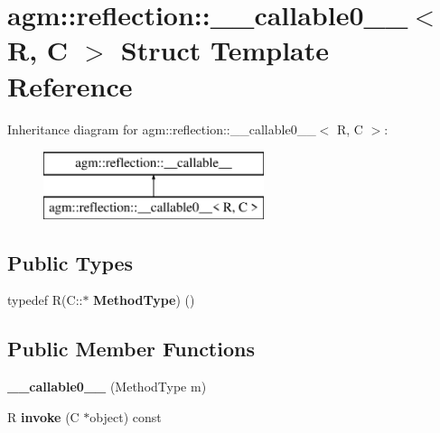 \hypertarget{structagm_1_1reflection_1_1____callable0____}{}\section{agm\+:\+:reflection\+:\+:\+\_\+\+\_\+callable0\+\_\+\+\_\+$<$ R, C $>$ Struct Template Reference}
\label{structagm_1_1reflection_1_1____callable0____}
Inheritance diagram for agm\+:\+:reflection\+:\+:\+\_\+\+\_\+callable0\+\_\+\+\_\+$<$ R, C $>$\+:\begin{figure}[H]
\begin{center}
\leavevmode
\includegraphics[height=2.000000cm]{structagm_1_1reflection_1_1____callable0____}
\end{center}
\end{figure}
\subsection*{Public Types}
\begin{DoxyCompactItemize}
\item 
typedef R(C\+::$\ast$ {\bfseries Method\+Type}) ()\hypertarget{structagm_1_1reflection_1_1____callable0_____ad9645c6039833612d539082e271edb31}{}\label{structagm_1_1reflection_1_1____callable0_____ad9645c6039833612d539082e271edb31}

\end{DoxyCompactItemize}
\subsection*{Public Member Functions}
\begin{DoxyCompactItemize}
\item 
{\bfseries \+\_\+\+\_\+callable0\+\_\+\+\_\+} (Method\+Type m)\hypertarget{structagm_1_1reflection_1_1____callable0_____a9151e8fee7756ace3044e13e69b3e6ec}{}\label{structagm_1_1reflection_1_1____callable0_____a9151e8fee7756ace3044e13e69b3e6ec}

\item 
R {\bfseries invoke} (C $\ast$object) const \hypertarget{structagm_1_1reflection_1_1____callable0_____ac4baa7a5c24a222107dadae9989be425}{}\label{structagm_1_1reflection_1_1____callable0_____ac4baa7a5c24a222107dadae9989be425}

\end{DoxyCompactItemize}
